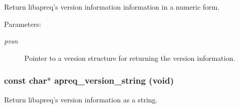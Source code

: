 Return libapreq's version information information in a numeric form.\begin{Desc}
\item[Parameters: ]\par
\begin{description}
\item[{\em 
pvsn}]Pointer to a version structure for returning the version information. \end{description}
\end{Desc}
\subsubsection{\setlength{\rightskip}{0pt plus 5cm}const char$\ast$ apreq\_\-version\_\-string ({\bf void})}\label{apreq__version_8h_a7}


Return libapreq's version information as a string. 